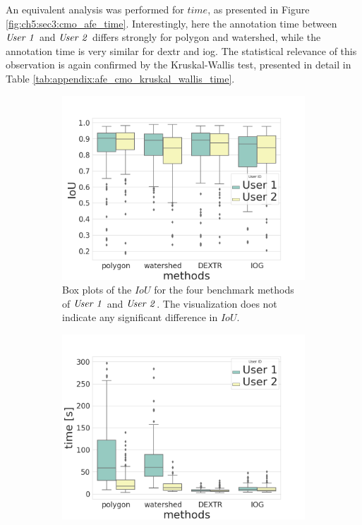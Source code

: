 An equivalent analysis was performed for $ time $, as presented in Figure \ref{fig:ch5:sec3:cmo_afe_time}.
Interestingly, here the annotation time between $ \textnormal{\textit{User 1}} $ and $ \textnormal{\textit{User 2}} $ differs strongly for polygon and watershed, while the annotation time is very similar for \gls{dextr} and \gls{iog}.
The statistical relevance of this observation is again confirmed by the Kruskal-Wallis test, presented in detail in Table \ref{tab:appendix:afe_cmo_kruskal_wallis_time}.

\begin{figure} [h!]
 	\centering
 	\begin{subfigure}[t]{0.45\textwidth}
 		\centering
 		\includegraphics[width=\textwidth]{figures/chap53_afe_cmo_iou.png}
 		\caption{
 			Box plots of the $ IoU $ for the four benchmark methods of $ \textnormal{\textit{User 1}} $ and $ \textnormal{\textit{User 2}} $.
 			The visualization does not indicate any significant difference in $ IoU $.
 		} \label{fig:ch5:sec3:cmo_afe_iou}
 	\end{subfigure}
 	\hfill
 	\begin{subfigure}[t]{0.45\textwidth}
 		\centering
 		\includegraphics[width=\textwidth]{figures/chap53_afe_cmo_time.png}

\end{subfigure}
\end{figure}

